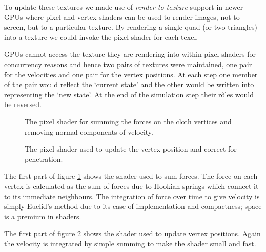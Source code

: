 To update these textures we made use of \emph{render to texture} support in newer GPUs
where pixel and vertex shaders can be used to render images, not to screen, but to
a particular texture. By rendering a single quad (or two triangles) into a texture
we could invoke the pixel shader for each texel.

GPUs cannot access the texture they are rendering into within pixel shaders for
concurrency reasons and hence two pairs of textures were maintained, one pair
for the velocities and one pair for the vertex positions. At each step one
member of the pair would reflect the `current state' and the other would be
written into representing the `new state'. At the end of the simulation step
their r\^oles would be reversed.


\begin{figure}[p]
\centering
\scalebox{0.7}{
\begin{minipage}{\textwidth}
\singlespacing

\end{minipage}}
\caption{\label{fig:calcForces}The pixel shader for summing the forces on the cloth vertices
and removing normal components of velocity.}
\end{figure}

\begin{figure}[p]
\centering
\scalebox{0.7}{
\begin{minipage}{\textwidth}
\singlespacing

\end{minipage}}
\caption{\label{fig:calcVertices}The pixel shader used to update the vertex position and
correct for penetration.}
\end{figure}

The first part of figure \ref{fig:calcForces} shows the shader used to sum forces. The force
on each vertex is calculated as the sum of forces due to Hookian springs which connect it
to its immediate neighbours. The integration of force over time to give velocity
is simply Euclid's method due to its ease of implementation and compactness; space is a premium
in shaders.

The first part of figure \ref{fig:calcVertices} shows the shader used to update vertex positions.
Again the velocity is integrated by simple summing to make the shader small and fast.

